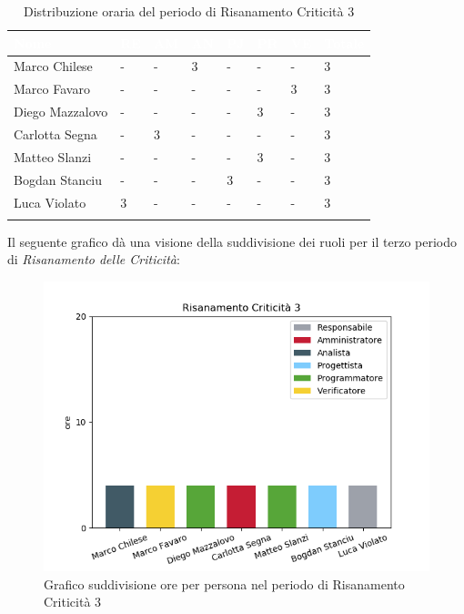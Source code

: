 \begin{longtable}{|C{.30\textwidth}|C{.06\textwidth}|C{.06\textwidth}|C{.06\textwidth} | C{.06\textwidth}| C{.06\textwidth} | C{.06\textwidth} | C{.10\textwidth} |}
\hline
{}	\textbf{\textcolor{white}{Nome}} & \textbf{\textcolor{white}{RE}} & \textbf{\textcolor{white}{AM}} & \textbf{\textcolor{white}{AN}} & \textbf{\textcolor{white}{PJ}} & \textbf{\textcolor{white}{PR}} & \textbf{\textcolor{white}{VE}} & \textbf{\textcolor{white}{Totale}}\\
\hline 
	Marco Chilese & - & - & 3 & - & - & - & 3 \\
	\hline
	Marco Favaro & - & - & - & - & - & 3 & 3 \\
	\hline
	Diego Mazzalovo & - & - & - & - & 3 & - & 3 \\
	\hline
	Carlotta Segna & - & 3 & - & - & - & - & 3 \\
	\hline
	Matteo Slanzi & - & - & - & - & 3 & - & 3 \\
	\hline
	Bogdan Stanciu & - & - & - & 3 & - & - & 3 \\
	\hline
	Luca Violato & 3 & - & - & - & - & - & 3 \\   
	\hline
	
	
	\caption{Distribuzione oraria del periodo di Risanamento Criticità 3}
	\label{Distribuzione oraria rc3}
\end{longtable}

Il seguente grafico dà una visione della suddivisione dei ruoli per il terzo periodo di  \textit{Risanamento delle Criticità}:\begin{figure}[H]
	\centering
	\includegraphics[width=0.8\linewidth]{./images/fig_rc3.png}
	\caption{Grafico suddivisione ore per persona nel periodo di Risanamento Criticità 3}
	\label{fig:grafico ore suddivione ruoli rc3}
\end{figure}

